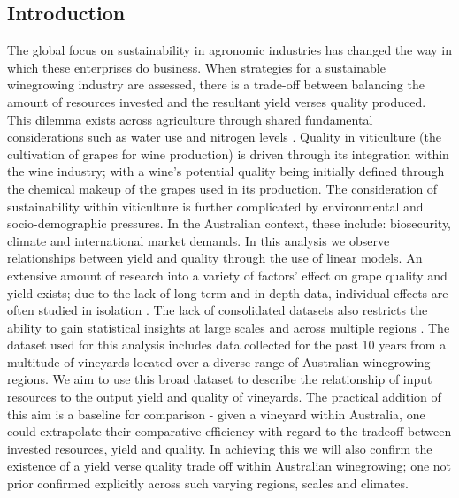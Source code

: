 \documentclass[review,12pt,authoryear]{elsarticle}
\begin{document}
\begin{linenumbers}
\section{Introduction}
The global focus on sustainability in agronomic industries has changed the way in which these enterprises do business. When strategies for a sustainable winegrowing industry are assessed, there is a trade-off between balancing the amount of resources invested and the resultant yield verses quality produced. This dilemma exists across agriculture through shared fundamental considerations such as water use and nitrogen levels \citep{hemmingCherryTomatoProduction2020,kawasakiQualityMattersMore2016, zhuEffectsNitrogenLevel2017}. Quality in viticulture (the cultivation of grapes for wine production) is driven through its integration within the wine industry; with a wine's potential quality being initially defined through the chemical makeup of the grapes used in its production. The consideration of sustainability within viticulture is further complicated by environmental and socio-demographic pressures. In the Australian context, these include: biosecurity, climate and international market demands.
\newline
In this analysis we observe relationships between yield and quality through the use of linear models. An extensive amount of research into a variety of factors' effect on grape quality and yield exists; due to the lack of long-term and in-depth data, individual effects are often studied in isolation \citep{abbalDecisionSupportSystem2016}. The lack of consolidated datasets also restricts the ability to gain statistical insights at large scales and across multiple regions \citep{keithjonesAustralianWineIndustry2002,knightFirmResourcesDevelopment2019}. The dataset used for this analysis includes data collected for the past 10 years from a multitude of vineyards located over a diverse range of Australian winegrowing regions.
\newline
We aim to use this broad dataset to describe the relationship of input resources to the output yield and quality of vineyards. The practical addition of this aim is a baseline for comparison - given a vineyard within Australia, one could extrapolate their comparative efficiency with regard to the tradeoff between invested resources, yield and quality. In achieving this we will also confirm the existence of a yield verse quality trade off within Australian winegrowing; one not prior confirmed explicitly across such varying regions, scales and climates. 

\end{linenumbers}
\end{document}
